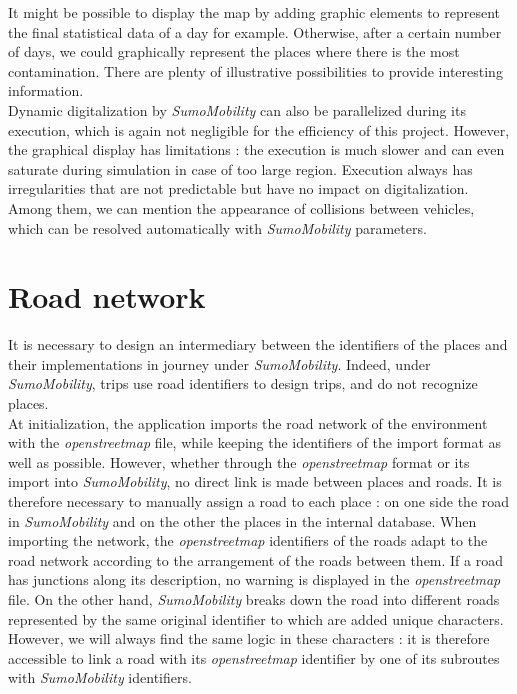 It might be possible to display the map by adding graphic elements to represent the final statistical data of a day for example. Otherwise, after a certain number of days, we could graphically represent the places where there is the most contamination. There are plenty of illustrative possibilities to provide interesting information.\\

Dynamic digitalization by \textit{SumoMobility} can also be parallelized during its execution, which is again not negligible for the efficiency of this project. However, the graphical display has limitations : the execution is much slower and can even saturate during simulation in case of too large region. Execution always has irregularities that are not predictable but have no impact on digitalization. Among them, we can mention the appearance of collisions between vehicles, which can be resolved automatically with \textit{SumoMobility} parameters.\\

\pagebreak

\section{Road network}

It is necessary to design an intermediary between the identifiers of the places and their implementations in journey under \textit{SumoMobility}. Indeed, under \textit{SumoMobility}, trips use road identifiers to design trips, and do not recognize places.\\

At initialization, the application imports the road network of the environment with the \textit{openstreetmap} file, while keeping the identifiers of the import format as well as possible. However, whether through the \textit{openstreetmap} format or its import into \textit{SumoMobility}, no direct link is made between places and roads. It is therefore necessary to manually assign a road to each place : on one side the road in \textit{SumoMobility} and on the other the places in the internal database. When importing the network, the \textit{openstreetmap} identifiers of the roads adapt to the road network according to the arrangement of the roads between them. If a road has junctions along its description, no warning is displayed in the \textit{openstreetmap} file. On the other hand, \textit{SumoMobility} breaks down the road into different roads represented by the same original identifier to which are added unique characters. However, we will always find the same logic in these characters : it is therefore accessible to link a road with its \textit{openstreetmap} identifier by one of its subroutes with \textit{SumoMobility} identifiers.\\

